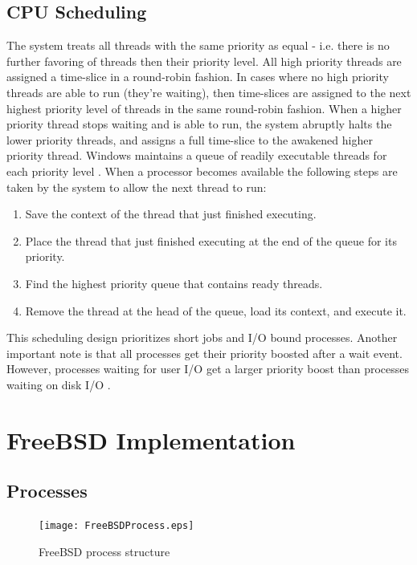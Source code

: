 \documentclass[onecolumn,draftclsnofoot, 10pt, compsoc]{IEEEtran}
\begin{document}
\subsection{CPU Scheduling}
	The system treats all threads with the same priority as equal - i.e. there is no further favoring of threads then their priority level.
	All high priority threads are assigned a time-slice in a round-robin fashion. 
	In cases where no high priority threads are able to run (they're waiting), then time-slices are assigned to the next highest priority level of threads in the same round-robin fashion.
	When a higher priority thread stops waiting and is able to run, the system abruptly halts the lower priority threads, and assigns a full time-slice to the awakened higher priority thread.
	Windows maintains a queue of readily executable threads for each priority level \cite{windowsCSwitchesMSDN}.
	When a processor becomes available the following steps are taken by the system to allow the next thread to run:
	\begin{enumerate}
		\item Save the context of the thread that just finished executing.
		\item Place the thread that just finished executing at the end of the queue for its priority.
		\item Find the highest priority queue that contains ready threads.
		\item Remove the thread at the head of the queue, load its context, and execute it.
	\end{enumerate}
	This scheduling design prioritizes short jobs and I/O bound processes. 
	Another important note is that all processes get their priority boosted after a wait event. However, processes waiting for user I/O get a larger priority boost than processes waiting on disk I/O \cite{schedulerWindows}. 
	
	


\section{FreeBSD Implementation}

\subsection{Processes}
	\begin{figure}[H]
		\texttt{[image: FreeBSDProcess.eps]}
		\centering
		\caption{FreeBSD process structure \cite{freeBSDProcess}}
		\label{fig:mesh1}
	\end{figure}
\end{document}
